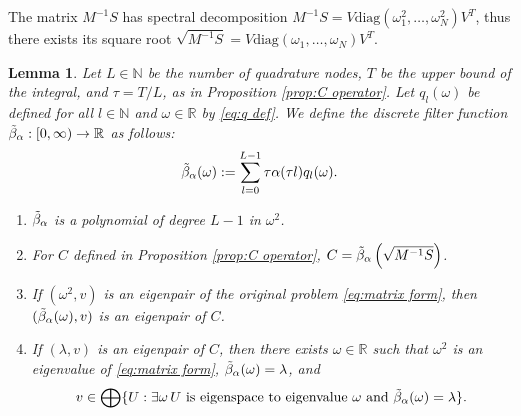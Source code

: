 \documentclass[a4paper,11pt,bibliography=totoc,listof=totoc,headinclude=true,cleardoublepage=empty,oneside]{scrbook}
\newtheorem{lemma}[theorem]{Lemma}
\newcommand{\R}{\mathbb{R}}
\newcommand{\N}{\mathbb{N}}
\newcommand{\dff}{\Tilde{\beta}_\alpha}
\begin{document}
The matrix $M^{-1}S$ has spectral decomposition $M^{-1}S = V\mathrm{diag}(\omega_1^2, \dots, \omega_N^2)V^T$, thus there exists its square root $\sqrt{M^{-1}S} = V\mathrm{diag}(\omega_1, \dots, \omega_N)V^T$. 

\begin{lemma}\label{lemma:dff}
    Let $L\in \N$ be the number of quadrature nodes, $T$ be the upper bound of the integral, and $\tau = T/L$, as in Proposition \ref{prop:C operator}. Let $q_l(\omega)$ be defined for all $l \in \N$ and $\omega \in \R$ by \eqref{eq:q def}. We define the discrete filter function $\dff: [0, \infty) \rightarrow \R$ as follows:
    \begin{equation}\label{eq:dff}
        \dff(\omega) := \sum_{l=0}^{L-1} \tau \alpha(\tau l) q_l(\omega).
    \end{equation}
    \begin{enumerate}
        \item $\dff$ is a polynomial of degree $L-1$ in $\omega^2$.
        \item For $C$ defined in Proposition \ref{prop:C operator}, $C = \dff\left(\sqrt{M^{-1}S}\right)$.
        \item If $(\omega^2, v)$ is an eigenpair of the original problem \eqref{eq:matrix form}, then $(\dff(\omega), v)$ is an eigenpair of $C$.
        \item If $(\lambda, v)$ is an eigenpair of $C$, then there exists $\omega \in \R$ such that $\omega^2$ is an eigenvalue of \eqref{eq:matrix form}, $\dff(\omega)=\lambda$, and
        \begin{equation*}
            v \in \bigoplus\{ U : \exists \omega \, U \text{ is eigenspace to eigenvalue } \omega \text{ and } \dff(\omega) = \lambda\}.
        \end{equation*}
    \end{enumerate}
\end{lemma}
\end{document}
